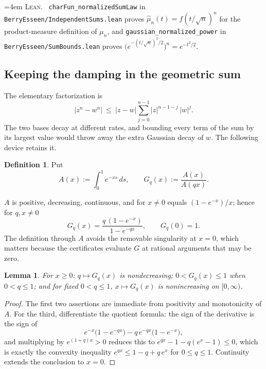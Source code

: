 \documentclass[10pt,a4paper]{article}
\theoremstyle{plain}
\newtheorem{lemma}[theorem]{Lemma}
\theoremstyle{definition}
\newtheorem{definition}[theorem]{Definition}
\newcommand{\lean}[1]{\texttt{#1}}
\newcommand{\file}[1]{\texttt{#1}}
\newenvironment{leanref}%
  {\par\addvspace{3pt}\begingroup\sloppy\emergencystretch=4em
   \noindent\footnotesize\textsc{Lean.}\ \ignorespaces}%
  {\par\endgroup\addvspace{3pt}}
\begin{document}
\begin{leanref}
\lean{charFun\_normalizedSumLaw} in \file{BerryEsseen/IndependentSums.lean}
proves $\hat\mu_n(t)=f(t/\sqrt n)^n$ for the product-measure definition of
$\mu_n$, and \lean{gaussian\_normalized\_power} in
\file{BerryEsseen/SumBounds.lean} proves
$\bigl(e^{-(t/\sqrt n)^2/2}\bigr)^n=e^{-t^2/2}$.
\end{leanref}

\subsection{Keeping the damping in the geometric sum}

The elementary factorization is
\begin{equation}\label{eq:power-diff}
  |z^n-w^n| \ \le\ |z-w|\sum_{j=0}^{n-1}|z|^{n-1-j}\,|w|^{j} .
\end{equation}
The two bases decay at different rates, and bounding every term of the sum by
its largest value would throw away the extra Gaussian decay of $w$. The
following device retains it.

\begin{definition}\label{def:geom}
Put
\[
  A(x) := \int_0^1 e^{-xs}\,ds,
  \qquad
  G_q(x) := \frac{A(x)}{A(qx)} .
\]
\end{definition}

$A$ is positive, decreasing, continuous, and for $x\ne0$ equals
$(1-e^{-x})/x$; hence for $q,x\ne0$
\[
  G_q(x) = \frac{q\,(1-e^{-x})}{1-e^{-qx}},
  \qquad G_q(0)=1 .
\]
The definition through $A$ avoids the removable singularity at $x=0$, which
matters because the certificates evaluate $G$ at rational arguments that may
be zero.

\begin{lemma}\label{lem:geom-monotone}
For $x\ge0$: $q\mapsto G_q(x)$ is nondecreasing; $0<G_q(x)\le1$ when
$0<q\le1$; and for fixed $0<q\le1$, $x\mapsto G_q(x)$ is nonincreasing on
$[0,\infty)$.
\end{lemma}

\begin{proof}
The first two assertions are immediate from positivity and monotonicity of $A$.
For the third, differentiate the quotient formula: the sign of the derivative is
the sign of
\[
  e^{-x}\bigl(1-e^{-qx}\bigr) - q\,e^{-qx}\bigl(1-e^{-x}\bigr),
\]
and multiplying by $e^{(1+q)x}>0$ reduces this to
$e^{qx}-1-q(e^x-1)\le0$, which is exactly the convexity inequality
$e^{qx}\le1-q+q\,e^x$ for $0\le q\le1$. Continuity extends the conclusion to
$x=0$.
\end{proof}
\end{document}
